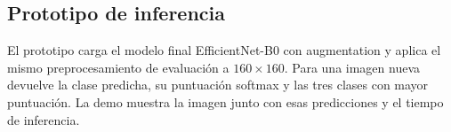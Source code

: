 \subsection{Prototipo de inferencia}
\label{subsec:prototipo}
El prototipo carga el modelo final EfficientNet-B0 con augmentation y aplica el mismo
preprocesamiento de evaluación a $160\times160$. Para una imagen nueva devuelve la clase
predicha, su puntuación softmax y las tres clases con mayor puntuación. La demo muestra la
imagen junto con esas predicciones y el tiempo de inferencia.
